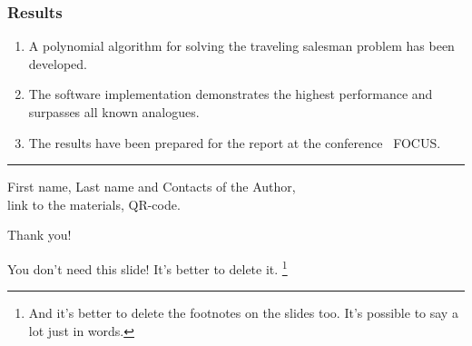 \documentclass[12pt,aspectratio=169,hyperref={pdftex,unicode},xcolor=dvipsnames]{beamer}
\begin{document}
    \begin{frame}
        \frametitle{Results}

        \begin{enumerate}
            \item A polynomial algorithm for solving the traveling salesman problem has been developed.
            \item The software implementation demonstrates the highest performance and surpasses all known analogues.
            \item The results have been prepared for the report at the conference ~FOCUS.
        \end{enumerate}

        \vspace{5mm}\hrule\vspace{5mm}

        \begin{center}
            First name, Last name and Contacts of the Author,\\link to the materials, QR-code.
        \end{center}

    \end{frame}

    \begin{frame}
        \begin{center}
            \Huge Thank you!

                {\color{red}You don't need this slide! It's better to delete it. \footnote{And it's better to delete the footnotes on the slides too. It's possible to say a lot just in words.}}
        \end{center}

    \end{frame}
\end{document}
